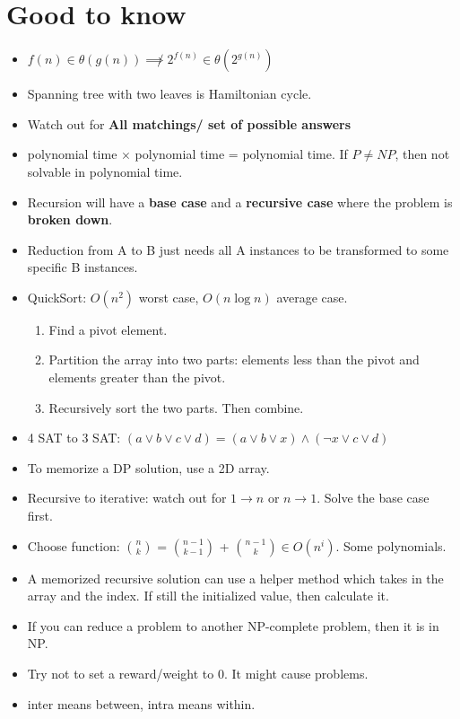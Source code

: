 \documentclass[conference]{IEEEtran}
\begin{document}
\section{Good to know}
\begin{itemize}
    \item $f(n) \in \theta(g(n)) \not \implies 2^{f(n)} \in \theta(2^{g(n)})$ 
    \item Spanning tree with two leaves is Hamiltonian cycle.
    \item Watch out for \textbf{All matchings/ set of possible answers}
    \item polynomial time $\times$ polynomial time = polynomial time. If $P\neq NP$, then not solvable in polynomial time.
    \item Recursion will have a \textbf{base case} and a \textbf{recursive case} where the problem is \textbf{broken down}.
    \item Reduction from A to B just needs all A instances to be transformed to some specific B instances.
    \item QuickSort: $O(n^2)$ worst case, $O(n \log n)$ average case. \begin{enumerate}
        \item Find a pivot element.
        \item Partition the array into two parts: elements less than the pivot and elements greater than the pivot.
        \item Recursively sort the two parts. Then combine.
    \end{enumerate}
    \item 4 SAT to 3 SAT: $(a \lor b \lor c \lor d) = (a \lor b \lor x) \land (\neg x \lor c \lor d)$
    \item To memorize a DP solution, use a 2D array.
    \item Recursive to iterative: watch out for $1\to n$ or $n\to 1$. Solve the base case first.
    \item Choose function: $n \choose k$ = $n-1 \choose k-1$ + $n-1 \choose k$$\in O(n^i)$. Some polynomials. 
    \item A memorized recursive solution can use a helper method which takes in the array and the index. If still the initialized value, then calculate it.
    \item If you can reduce a problem to another NP-complete problem, then it is in NP.
    \item Try not to set a reward/weight to 0. It might cause problems.
    \item inter means between, intra means within.
\end{itemize}
\end{document}
